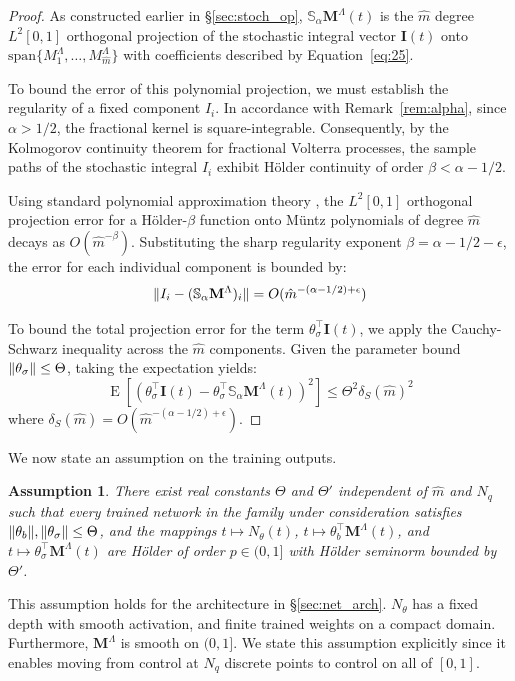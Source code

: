 \documentclass[11pt, a4paper]{article}
\theoremstyle{theoremstyle}
\theoremstyle{definitionstyle}
\newtheorem{assumption}[theorem]{Assumption}
\DeclareMathOperator{\EE}{\mathrm E}
\DeclarePairedDelimiter{\norm}{\lVert}{\rVert}
\begin{document}
\begin{proof}
    As constructed earlier in \S\ref{sec:stoch_op}, \( \mathbb S_\alpha \mathbf M^\Lambda (t) \) is the \( \hat m \) degree \( L^2[0, 1] \) orthogonal projection of the stochastic integral vector \( \mathbf I(t) \) onto \(\mathrm{span} \{M_1^\Lambda, \dots , M_{\hat m}^\Lambda\}\) with coefficients described by Equation~\ref{eq:25}.

    To bound the error of this polynomial projection, we must establish the regularity of a fixed component \( I_i \). In accordance with Remark~\ref{rem:alpha}, since \( \alpha > 1/2 \), the fractional kernel is square-integrable. Consequently, by the Kolmogorov continuity theorem for fractional Volterra processes, the sample paths of the stochastic integral \( I_i \) exhibit H\"older continuity of order \( \beta < \alpha - 1/2 \). 

    Using standard polynomial approximation theory \cite[\S 7.6]{devore1993constructive}, the \( L^2[0,1] \) orthogonal projection error for a H\"older-\(\beta\) function onto Müntz polynomials of degree \( \hat{m} \) decays as \( O(\hat{m}^{-\beta}) \). Substituting the sharp regularity exponent \( \beta = \alpha - 1/2 - \epsilon \), the error for each individual component is bounded by:
    \begin{equation}
        \norm{I_i - (\mathbb{S}_\alpha \mathbf{M}^\Lambda)_i} = O(\hat{m}^{-(\alpha - 1/2) + \epsilon})
    \end{equation}
    
    To bound the total projection error for the term \( \theta_\sigma^\top \mathbf{I}(t) \), we apply the Cauchy-Schwarz inequality across the \( \hat{m} \) components. Given the parameter bound \( \norm{\theta_\sigma} \leq \Theta \), taking the expectation yields:
    \begin{equation}
        \EE \left[ \left ( \theta_\sigma^\top \mathbf{I}(t) - \theta_\sigma^\top \mathbb S_\alpha \mathbf M^\Lambda(t) \right )^2 \right] \le \Theta^2 \delta_S(\hat{m})^2
    \end{equation}
    where \( \delta_S(\hat{m}) = O(\hat{m}^{-(\alpha - 1/2) + \epsilon}) \).
\end{proof}

We now state an assumption on the training outputs.

\begin{assumption}\label{as:3.3}
    There exist real constants \(\Theta\) and \(\Theta'\) independent of \(\hat m\) and \(N_q\) such that every trained network in the family under consideration satisfies \(\norm{\theta_b}, \norm{\theta_\sigma} \leq \Theta\), and the mappings \(t \mapsto N_\theta(t)\), \(t \mapsto \theta_b^\top \mathbf M^\Lambda(t)\), and \(t \mapsto \theta_\sigma^\top \mathbf M^\Lambda (t)\) are H\"older of order \(p \in (0, 1]\) with H\"older seminorm bounded by \(\Theta'\).
\end{assumption}
This assumption holds for the architecture in \S\ref{sec:net_arch}. \(N_\theta\) has a fixed depth with smooth activation, and finite trained weights on a compact domain. Furthermore, \(\mathbf M^\Lambda\) is smooth on \((0, 1]\). We state this assumption explicitly since it enables moving from control at \(N_q\) discrete points to control on all of \([0, 1]\).
\end{document}

